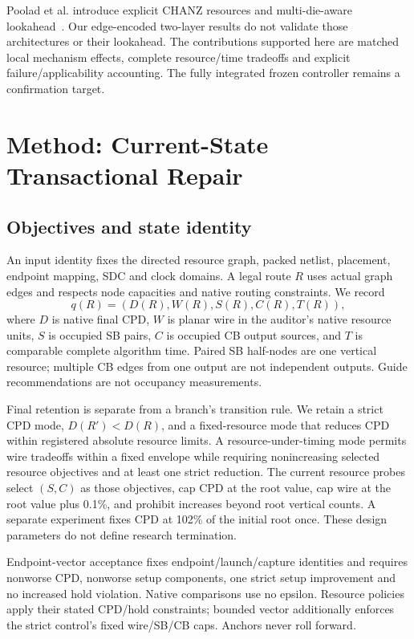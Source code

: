 \documentclass[conference,10pt]{IEEEtran}
\begin{document}
Poolad et al. introduce explicit CHANZ resources and multi-die-aware lookahead~\cite{multidie}. Our edge-encoded two-layer results do not validate those architectures or their lookahead. The contributions supported here are matched local mechanism effects, complete resource/time tradeoffs and explicit failure/applicability accounting. The fully integrated frozen controller remains a confirmation target.
\section{Method: Current-State Transactional Repair}
\subsection{Objectives and state identity}
An input identity fixes the directed resource graph, packed netlist, placement, endpoint mapping, SDC and clock domains. A legal route $R$ uses actual graph edges and respects node capacities and native routing constraints. We record
\begin{equation}
 q(R)=(D(R),W(R),S(R),C(R),T(R)),
\end{equation}
where $D$ is native final CPD, $W$ is planar wire in the auditor's native resource units, $S$ is occupied SB pairs, $C$ is occupied CB output sources, and $T$ is comparable complete algorithm time. Paired SB half-nodes are one vertical resource; multiple CB edges from one output are not independent outputs. Guide recommendations are not occupancy measurements.

Final retention is separate from a branch's transition rule. We retain a strict CPD mode, $D(R')<D(R)$, and a fixed-resource mode that reduces CPD within registered absolute resource limits. A resource-under-timing mode permits wire tradeoffs within a fixed envelope while requiring nonincreasing selected resource objectives and at least one strict reduction. The current resource probes select $(S,C)$ as those objectives, cap CPD at the root value, cap wire at the root value plus 0.1\%, and prohibit increases beyond root vertical counts. A separate experiment fixes CPD at 102\% of the initial root once. These design parameters do not define research termination.

Endpoint-vector acceptance fixes endpoint/launch/capture identities and requires nonworse CPD, nonworse setup components, one strict setup improvement and no increased hold violation. Native comparisons use no epsilon. Resource policies apply their stated CPD/hold constraints; bounded vector additionally enforces the strict control's fixed wire/SB/CB caps. Anchors never roll forward.
\end{document}
